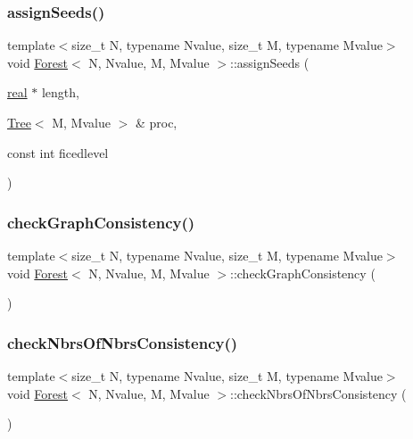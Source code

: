 \mbox{\label{classForest_a70b0db81bf2daade13e4c485e9093df9}} 
\subsubsection{\texorpdfstring{assign\+Seeds()}{assignSeeds()}}
{\footnotesize\ttfamily template$<$size\+\_\+t N, typename Nvalue, size\+\_\+t M, typename Mvalue$>$ \\
void \mbox{\hyperlink{classForest}{Forest}}$<$ N, Nvalue, M, Mvalue $>$\+::assign\+Seeds (\begin{DoxyParamCaption}\item[{\mbox{\hyperlink{definitions_8h_aedc0ad84d1e764530814f57ad931d02a}{real}} $\ast$}]{length,  }\item[{\mbox{\hyperlink{classTree}{Tree}}$<$ M, Mvalue $>$ \&}]{proc,  }\item[{const int}]{ficedlevel }\end{DoxyParamCaption})}

\mbox{\label{classForest_a04578eeef2e9b141213a72460beba78d}} 
\subsubsection{\texorpdfstring{check\+Graph\+Consistency()}{checkGraphConsistency()}}
{\footnotesize\ttfamily template$<$size\+\_\+t N, typename Nvalue, size\+\_\+t M, typename Mvalue$>$ \\
void \mbox{\hyperlink{classForest}{Forest}}$<$ N, Nvalue, M, Mvalue $>$\+::check\+Graph\+Consistency (\begin{DoxyParamCaption}{ }\end{DoxyParamCaption})}

\mbox{\label{classForest_ac3d632acc8f403d10ca83f0c6afd88af}} 
\subsubsection{\texorpdfstring{check\+Nbrs\+Of\+Nbrs\+Consistency()}{checkNbrsOfNbrsConsistency()}}
{\footnotesize\ttfamily template$<$size\+\_\+t N, typename Nvalue, size\+\_\+t M, typename Mvalue$>$ \\
void \mbox{\hyperlink{classForest}{Forest}}$<$ N, Nvalue, M, Mvalue $>$\+::check\+Nbrs\+Of\+Nbrs\+Consistency (\begin{DoxyParamCaption}{ }\end{DoxyParamCaption})}

